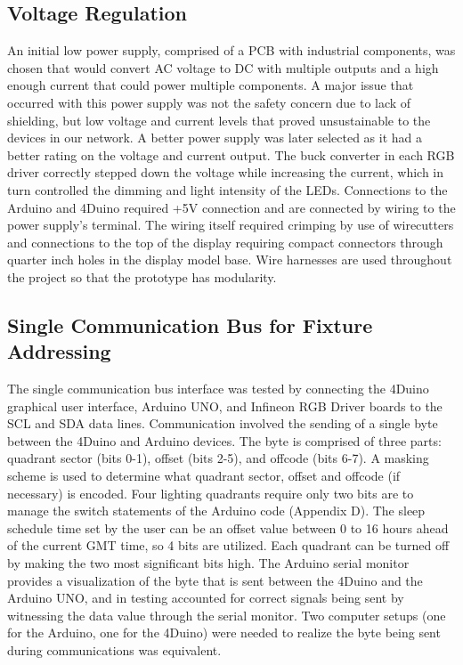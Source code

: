 \documentclass[12pt,a4paper]{report}
\begin{document}
\subsection{Voltage Regulation}
An initial low power supply, comprised of a PCB with industrial components, was chosen that would convert AC voltage to DC with multiple outputs and a high enough current that could power multiple components. A major issue that occurred with this power supply was not the safety concern due to lack of shielding, but low voltage and current levels that proved unsustainable to the devices in our network. A better power supply was later selected as it had a better rating on the voltage and current output. The buck converter in each RGB driver correctly stepped down the voltage while increasing the current, which in turn controlled the dimming and light intensity of the LEDs. Connections to the Arduino and 4Duino required +5V connection and are connected by wiring to the power supply's terminal. The wiring itself required crimping by use of wirecutters and connections to the top of the display requiring compact connectors through quarter inch holes in the display model base. Wire harnesses are used throughout the project so that the prototype has modularity. \\

\subsection{Single Communication Bus for Fixture Addressing}
The single communication bus interface was tested by connecting the 4Duino graphical user interface, Arduino UNO, and Infineon RGB Driver boards to the SCL and SDA data lines. Communication involved the sending of a single byte between the 4Duino and Arduino devices. The byte is comprised of three parts: quadrant sector (bits 0-1), offset (bits 2-5), and offcode (bits 6-7). A masking scheme is used to determine what quadrant sector, offset and offcode (if necessary) is encoded. Four lighting quadrants require only two bits are to manage the switch statements of the Arduino code (Appendix D). The sleep schedule time set by the user can be an offset value between 0 to 16 hours ahead of the current GMT time, so 4 bits are utilized. Each quadrant can be turned off by making the two most significant bits high. The Arduino serial monitor provides a visualization of the byte that is sent between the 4Duino and the Arduino UNO, and in testing accounted for correct signals being sent by witnessing the data value through the serial monitor. Two computer setups (one for the Arduino, one for the 4Duino) were needed to realize the byte being sent during communications was equivalent. \\
\end{document}
